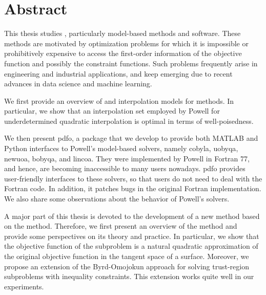 %
%
%
\chapter*{Abstract}
\label{ch:abstract}

This thesis studies , particularly model-based methods and software.
These methods are motivated by optimization problems for which it is impossible or prohibitively expensive to access the first-order information of the objective function and possibly the constraint functions.
Such problems frequently arise in engineering and industrial applications, and keep emerging due to recent advances in data science and machine learning.

We first provide an overview of  and interpolation models for  methods.
In particular, we show that an interpolation set employed by Powell for underdetermined quadratic interpolation is optimal in terms of well-poisedness.

We then present \gls{pdfo}, a package that we develop to provide both MATLAB and Python interfaces to Powell's model-based  solvers, namely \gls{cobyla}, \gls{uobyqa}, \gls{newuoa}, \gls{bobyqa}, and \gls{lincoa}.
They were implemented by Powell in Fortran 77, and hence, are becoming inaccessible to many users nowadays.
\Gls{pdfo} provides user-friendly interfaces to these solvers, so that users do not need to deal with the Fortran code.
In addition, it patches bugs in the original Fortran implementation.
We also share some observations about the behavior of Powell's solvers.

A major part of this thesis is devoted to the development of a new  method based on the  method.
Therefore, we first present an overview of the  method and provide some perspectives on its theory and practice.
In particular, we show that the objective function of the  subproblem is a natural quadratic approximation of the original objective function in the tangent space of a surface.
Moreover, we propose an extension of the Byrd-Omojokun approach for solving trust-region  subproblems with inequality constraints.
This extension works quite well in our experiments.

